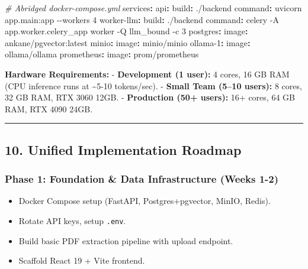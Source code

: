 \documentclass[
]{article}
\newenvironment{Shaded}{}{}
\newcommand{\AttributeTok}[1]{\textcolor[rgb]{0.49,0.56,0.16}{#1}}
\newcommand{\CommentTok}[1]{\textcolor[rgb]{0.38,0.63,0.69}{\textit{#1}}}
\newcommand{\FunctionTok}[1]{\textcolor[rgb]{0.02,0.16,0.49}{#1}}
\newcommand{\KeywordTok}[1]{\textcolor[rgb]{0.00,0.44,0.13}{\textbf{#1}}}
\providecommand{\tightlist}{%
  \setlength{\itemsep}{0pt}\setlength{\parskip}{0pt}}
\begin{document}
\begin{Shaded}
\begin{Highlighting}[]
\CommentTok{\# Abridged docker{-}compose.yml}
\FunctionTok{services}\KeywordTok{:}
\AttributeTok{  }\FunctionTok{api}\KeywordTok{:}
\AttributeTok{    }\FunctionTok{build}\KeywordTok{:}\AttributeTok{ ./backend}
\AttributeTok{    }\FunctionTok{command}\KeywordTok{:}\AttributeTok{ uvicorn app.main:app {-}{-}workers 4}
\AttributeTok{  }\FunctionTok{worker{-}llm}\KeywordTok{:}
\AttributeTok{    }\FunctionTok{build}\KeywordTok{:}\AttributeTok{ ./backend}
\AttributeTok{    }\FunctionTok{command}\KeywordTok{:}\AttributeTok{ celery {-}A app.worker.celery\_app worker {-}Q llm\_bound {-}c 3}
\AttributeTok{  }\FunctionTok{postgres}\KeywordTok{:}
\AttributeTok{    }\FunctionTok{image}\KeywordTok{:}\AttributeTok{ ankane/pgvector:latest}
\AttributeTok{  }\FunctionTok{minio}\KeywordTok{:}
\AttributeTok{    }\FunctionTok{image}\KeywordTok{:}\AttributeTok{ minio/minio}
\AttributeTok{  }\FunctionTok{ollama{-}1}\KeywordTok{:}
\AttributeTok{    }\FunctionTok{image}\KeywordTok{:}\AttributeTok{ ollama/ollama}
\AttributeTok{  }\FunctionTok{prometheus}\KeywordTok{:}
\AttributeTok{    }\FunctionTok{image}\KeywordTok{:}\AttributeTok{ prom/prometheus}
\end{Highlighting}
\end{Shaded}

\textbf{Hardware Requirements:} - \textbf{Development (1 user):} 4
cores, 16 GB RAM (CPU inference runs at \textasciitilde5-10 tokens/sec).
- \textbf{Small Team (5--10 users):} 8 cores, 32 GB RAM, RTX 3060 12GB.
- \textbf{Production (50+ users):} 16+ cores, 64 GB RAM, RTX 4090 24GB.

\begin{center}\rule{0.5\linewidth}{0.5pt}\end{center}

\subsection{10. Unified Implementation
Roadmap}\label{unified-implementation-roadmap}

\subsubsection{Phase 1: Foundation \& Data Infrastructure (Weeks
1-2)}\label{phase-1-foundation-data-infrastructure-weeks-1-2}

\begin{itemize}
\tightlist
\item
  Docker Compose setup (FastAPI, Postgres+pgvector, MinIO, Redis).
\item
  Rotate API keys, setup \texttt{.env}.
\item
  Build basic PDF extraction pipeline with upload endpoint.
\item
  Scaffold React 19 + Vite frontend.
\end{itemize}
\end{document}

